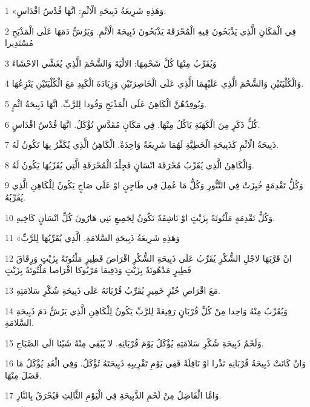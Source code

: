 \par 1 «وَهَذِهِ شَرِيعَةُ ذَبِيحَةِ الْاثْمِ: انَّهَا قُدْسُ اقْدَاسٍ.
\par 2 فِي الْمَكَانِ الَّذِي يَذْبَحُونَ فِيهِ الْمُحْرَقَةَ يَذْبَحُونَ ذَبِيحَةَ الْاثْمِ. وَيَرُشُّ دَمَهَا عَلَى الْمَذْبَحِ مُسْتَدِيرا
\par 3 وَيُقَرِّبُ مِنْهَا كُلَّ شَحْمِهَا: الالْيَةَ وَالشَّحْمَ الَّذِي يُغَشِّي الاحْشَاءَ
\par 4 وَالْكُلْيَتَيْنِ وَالشَّحْمَ الَّذِي عَلَيْهِمَا الَّذِي عَلَى الْخَاصِرَتَيْنِ وَزِيَادَةَ الْكَبِدِ مَعَ الْكُلْيَتَيْنِ يَنْزِعُهَا.
\par 5 وَيُوقِدُهُنَّ الْكَاهِنُ عَلَى الْمَذْبَحِ وَقُودا لِلرَّبِّ. انَّهَا ذَبِيحَةُ اثْمٍ.
\par 6 كُلُّ ذَكَرٍ مِنَ الْكَهَنَةِ يَاكُلُ مِنْهَا. فِي مَكَانٍ مُقَدَّسٍ تُؤْكَلُ. انَّهَا قُدْسُ اقْدَاسٍ.
\par 7 ذَبِيحَةُ الْاثْمِ كَذَبِيحَةِ الْخَطِيَّةِ لَهُمَا شَرِيعَةٌ وَاحِدَةٌ. الْكَاهِنُ الَّذِي يُكَفِّرُ بِهَا تَكُونُ لَهُ.
\par 8 وَالْكَاهِنُ الَّذِي يُقَرِّبُ مُحْرَقَةَ انْسَانٍ فَجِلْدُ الْمُحْرَقَةِ الَّتِي يُقَرِّبُهَا يَكُونُ لَهُ.
\par 9 وَكُلُّ تَقْدِمَةٍ خُبِزَتْ فِي التَّنُّورِ وَكُلُّ مَا عُمِلَ فِي طَاجِنٍ اوْ عَلَى صَاجٍ يَكُونُ لِلْكَاهِنِ الَّذِي يُقَرِّبُهُ.
\par 10 وَكُلُّ تَقْدِمَةٍ مَلْتُوتَةً بِزَيْتٍ اوْ نَاشِفَةً تَكُونُ لِجَمِيعِ بَنِي هَارُونَ كُلِّ انْسَانٍ كَاخِيهِ.
\par 11 «وَهَذِهِ شَرِيعَةُ ذَبِيحَةِ السَّلامَةِ. الَّذِي يُقَرِّبُهَا لِلرَّبِّ
\par 12 انْ قَرَّبَهَا لاجْلِ الشُّكْرِ يُقَرِّبُ عَلَى ذَبِيحَةِ الشُّكْرِ اقْرَاصَ فَطِيرٍ مَلْتُوتَةً بِزَيْتٍ وَرِقَاقَ فَطِيرٍ مَدْهُونَةً بِزَيْتٍ وَدَقِيقا مَرْبُوكا اقْرَاصا مَلْتُوتَةً بِزَيْتٍ
\par 13 مَعَ اقْرَاصِ خُبْزٍ خَمِيرٍ يُقَرِّبُ قُرْبَانَهُ عَلَى ذَبِيحَةِ شُكْرِ سَلامَتِهِ.
\par 14 وَيُقَرِّبُ مِنْهُ وَاحِدا مِنْ كُلِّ قُرْبَانٍ رَفِيعَةً لِلرَّبِّ يَكُونُ لِلْكَاهِنِ الَّذِي يَرُشُّ دَمَ ذَبِيحَةِ السَّلامَةِ.
\par 15 وَلَحْمُ ذَبِيحَةِ شُكْرِ سَلامَتِهِ يُؤْكَلُ يَوْمَ قُرْبَانِهِ. لا يُبْقِي مِنْهُ شَيْئا الَى الصَّبَاحِ.
\par 16 وَانْ كَانَتْ ذَبِيحَةُ قُرْبَانِهِ نَذْرا اوْ نَافِلَةً فَفِي يَوْمِ تَقْرِيبِهِ ذَبِيحَتَهُ تُؤْكَلُ. وَفِي الْغَدِ يُؤْكَلُ مَا فَضَلَ مِنْهَا.
\par 17 وَامَّا الْفَاضِلُ مِنْ لَحْمِ الذَّبِيحَةِ فِي الْيَوْمِ الثَّالِثِ فَيُحْرَقُ بِالنَّارِ.
